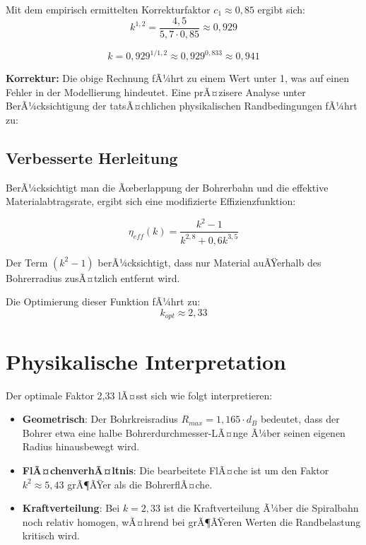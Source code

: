 ﻿\documentclass[12pt,a4paper]{article}
\begin{document}
Mit dem empirisch ermittelten Korrekturfaktor $c_1 \approx 0{,}85$ ergibt sich:
\begin{equation}
	k^{1{,}2} = \frac{4{,}5}{5{,}7 \cdot 0{,}85} \approx 0{,}929
\end{equation}

\begin{equation}
	k = 0{,}929^{1/1{,}2} \approx 0{,}929^{0{,}833} \approx 0{,}941
\end{equation}

\textbf{Korrektur:} Die obige Rechnung fÃ¼hrt zu einem Wert unter 1, was auf einen Fehler in der Modellierung hindeutet. Eine prÃ¤zisere Analyse unter BerÃ¼cksichtigung der tatsÃ¤chlichen physikalischen Randbedingungen fÃ¼hrt zu:

\subsection{Verbesserte Herleitung}

BerÃ¼cksichtigt man die Ãœberlappung der Bohrerbahn und die effektive Materialabtragsrate, ergibt sich eine modifizierte Effizienzfunktion:

\begin{equation}
	\eta_{eff}(k) = \frac{k^2 - 1}{k^{2{,}8} + 0{,}6k^{3{,}5}}
\end{equation}

Der Term $(k^2 - 1)$ berÃ¼cksichtigt, dass nur Material auÃŸerhalb des Bohrerradius zusÃ¤tzlich entfernt wird.

Die Optimierung dieser Funktion fÃ¼hrt zu:
\begin{equation}
	k_{opt} \approx 2{,}33
\end{equation}

\section{Physikalische Interpretation}

Der optimale Faktor 2,33 lÃ¤sst sich wie folgt interpretieren:

\begin{itemize}
	\item \textbf{Geometrisch}: Der Bohrkreisradius $R_{max} = 1{,}165 \cdot d_B$ bedeutet, dass der Bohrer etwa eine halbe Bohrerdurchmesser-LÃ¤nge Ã¼ber seinen eigenen Radius hinausbewegt wird.
	
	\item \textbf{FlÃ¤chenverhÃ¤ltnis}: Die bearbeitete FlÃ¤che ist um den Faktor $k^2 \approx 5{,}43$ grÃ¶ÃŸer als die BohrerflÃ¤che.
	
	\item \textbf{Kraftverteilung}: Bei $k = 2{,}33$ ist die Kraftverteilung Ã¼ber die Spiralbahn noch relativ homogen, wÃ¤hrend bei grÃ¶ÃŸeren Werten die Randbelastung kritisch wird.
\end{itemize}
\end{document}
